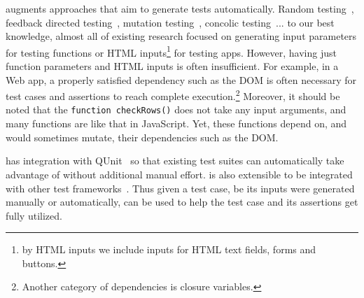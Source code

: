 \tool augments approaches that aim to generate tests automatically.  
Random testing~\cite{}, feedback directed testing~\cite{}, mutation testing~\cite{}, concolic testing~\cite{}... to our best knowledge, almost all of existing research focused on generating input parameters for testing functions or HTML inputs\footnote{by HTML inputs we include inputs for HTML text fields, forms and buttons.} for testing apps.
However, having just function parameters and HTML inputs is often insufficient.  For example, in a Web app, a properly satisfied dependency such as the DOM is often necessary for test cases and assertions to reach complete execution.\footnote{Another category of dependencies is closure variables.}
Moreover, it should be noted that the {\tt function checkRows()} does not take any input arguments, and many functions are like that in JavaScript.
Yet, these functions depend on, and would sometimes mutate, their dependencies such as the DOM.

\tool has integration with QUnit~\cite{qunit} so that existing test suites can automatically take advantage of \tool without additional manual effort.  \tool is also extensible to be integrated with other test frameworks~\cite{jstests}.
Thus given a test case, be its inputs were generated manually or automatically, \tool can be used to help the test case and its assertions get fully utilized.

